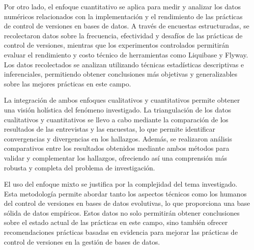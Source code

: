 \documentclass{IEEEtran}
\begin{document}
Por otro lado, el enfoque cuantitativo se aplica para medir y analizar los datos numéricos relacionados con la implementación y el rendimiento de las prácticas de control de versiones en bases de datos. A través de encuestas estructuradas, se recolectaron datos sobre la frecuencia, efectividad y desafíos de las prácticas de control de versiones, mientras que los experimentos controlados permitirán evaluar el rendimiento y costo técnico de herramientas como Liquibase y Flyway. Los datos recolectados se analizan utilizando técnicas estadísticas descriptivas e inferenciales, permitiendo obtener conclusiones más objetivas y generalizables sobre las mejores prácticas en este campo.

La integración de ambos enfoques cualitativos y cuantitativos permite obtener una visión holística del fenómeno investigado. La triangulación de los datos cualitativos y cuantitativos se llevo a cabo mediante la comparación de los resultados de las entrevistas y las encuestas, lo que permite identificar convergencias y divergencias en los hallazgos. Además, se realizaron análisis comparativos entre los resultados obtenidos mediante ambos métodos para validar y complementar los hallazgos, ofreciendo así una comprensión más robusta y completa del problema de investigación.

El uso del enfoque mixto se justifica por la complejidad del tema investigado. Esta metodología permite abordar tanto los aspectos técnicos como los humanos del control de versiones en bases de datos evolutivas, lo que proporciona una base sólida de datos empíricos. Estos datos no solo permitirán obtener conclusiones sobre el estado actual de las prácticas en este campo, sino también ofrecer recomendaciones prácticas basadas en evidencia para mejorar las prácticas de control de versiones en la gestión de bases de datos.


    
\end{document}

